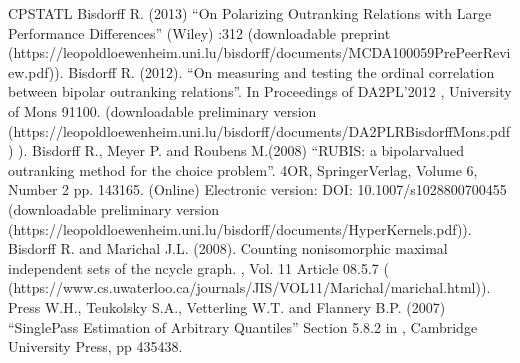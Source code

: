 \documentclass[a4paper,10pt,english]{sphinxhowto}
\begin{document}
\begin{sphinxthebibliography}{CPSTAT\sphinxhyphen{}L}
Bisdorff R. (2013) “On Polarizing Outranking Relations with Large Performance Differences”  (Wiley) :3\sphinxhyphen{}12 (downloadable preprint  (https://leopold\sphinxhyphen{}loewenheim.uni.lu/bisdorff/documents/MCDA\sphinxhyphen{}10\sphinxhyphen{}0059\sphinxhyphen{}PrePeerReview.pdf)).
Bisdorff R. (2012). “On measuring and testing the ordinal correlation between bipolar outranking relations”. In Proceedings of DA2PL’2012 , University of Mons 91\sphinxhyphen{}100. (downloadable preliminary version  (https://leopold\sphinxhyphen{}loewenheim.uni.lu/bisdorff/documents/DA2PL\sphinxhyphen{}RBisdorffMons.pdf) ).
Bisdorff R., Meyer P. and Roubens M.(2008) “RUBIS: a bipolar\sphinxhyphen{}valued outranking method for the choice problem”. 4OR,  Springer\sphinxhyphen{}Verlag, Volume 6,  Number 2 pp. 143\sphinxhyphen{}165. (Online) Electronic version: DOI: 10.1007/s10288\sphinxhyphen{}007\sphinxhyphen{}0045\sphinxhyphen{}5 (downloadable preliminary version  (https://leopold\sphinxhyphen{}loewenheim.uni.lu/bisdorff/documents/HyperKernels.pdf)).
Bisdorff R. and Marichal J.\sphinxhyphen{}L. (2008). Counting non\sphinxhyphen{}isomorphic maximal independent sets of the n\sphinxhyphen{}cycle graph. , Vol. 11 Article 08.5.7 ( (https://www.cs.uwaterloo.ca/journals/JIS/VOL11/Marichal/marichal.html)).
Press W.H., Teukolsky S.A., Vetterling W.T. and Flannery B.P. (2007) “Single\sphinxhyphen{}Pass Estimation of Arbitrary Quantiles” Section 5.8.2 in , Cambridge University Press, pp 435\sphinxhyphen{}438.

\end{sphinxthebibliography}
\end{document}

